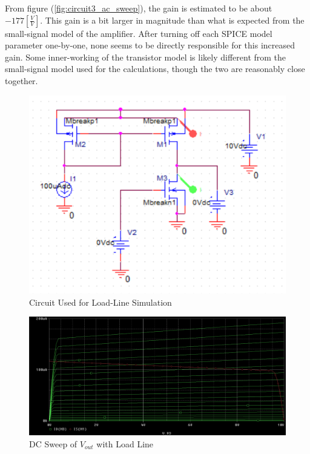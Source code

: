 \FloatBarrier

From figure (\ref{fig:circuit3_ac_sweep}), the gain is estimated to be about $-177[\frac{V}{V}]$. This gain is a bit larger in magnitude than what is expected from the small-signal model of the amplifier. After turning off each SPICE model parameter one-by-one, none seems to be directly responsible for this increased gain. Some inner-working of the transistor model is likely different from the small-signal model used for the calculations, though the two are reasonably close together.

\FloatBarrier

\begin{figure}[h!]
	\centering
	\includegraphics[scale=0.75]{./images/circuit4.PNG}
	\caption{Circuit Used for Load-Line Simulation}
	\label{fig:circuit4}
\end{figure}

\FloatBarrier

\FloatBarrier

\begin{figure}[h!]
	\centering
	\includegraphics[scale=0.50]{./images/circuit4_dc_sweep_vout.PNG}
	\caption{DC Sweep of $V_{out}$ with Load Line}
	\label{fig:circuit4_dc_sweep_vout}
\end{figure}


